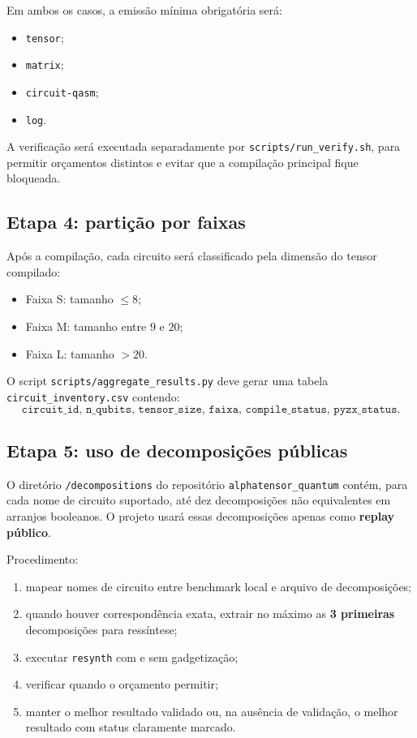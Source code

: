 \documentclass[a4paper,11pt]{article}
\begin{document}
Em ambos os casos, a emissão mínima obrigatória será:
\begin{itemize}
  \item \texttt{tensor};
  \item \texttt{matrix};
  \item \texttt{circuit-qasm};
  \item \texttt{log}.
\end{itemize}

A verificação será executada separadamente por \texttt{scripts/run\_verify.sh}, para permitir orçamentos distintos e evitar que a compilação principal fique bloqueada.

\subsection*{Etapa 4: partição por faixas}

Após a compilação, cada circuito será classificado pela dimensão do tensor compilado:
\begin{itemize}
  \item Faixa S: tamanho $\leq 8$;
  \item Faixa M: tamanho entre $9$ e $20$;
  \item Faixa L: tamanho $>20$.
\end{itemize}

O script \texttt{scripts/aggregate\_results.py} deve gerar uma tabela \texttt{circuit\_inventory.csv} contendo:
\[
\texttt{circuit\_id, n\_qubits, tensor\_size, faixa, compile\_status, pyzx\_status.}
\]

\subsection*{Etapa 5: uso de decomposições públicas}

O diretório \texttt{/decompositions} do repositório \texttt{alphatensor\_quantum} contém, para cada nome de circuito suportado, até dez decomposições não equivalentes em arranjos booleanos. O projeto usará essas decomposições apenas como \textbf{replay público}.

Procedimento:
\begin{enumerate}
  \item mapear nomes de circuito entre benchmark local e arquivo de decomposições;
  \item quando houver correspondência exata, extrair no máximo as \textbf{3 primeiras} decomposições para ressíntese;
  \item executar \texttt{resynth} com e sem gadgetização;
  \item verificar quando o orçamento permitir;
  \item manter o melhor resultado validado ou, na ausência de validação, o melhor resultado com status claramente marcado.
\end{enumerate}
\end{document}
